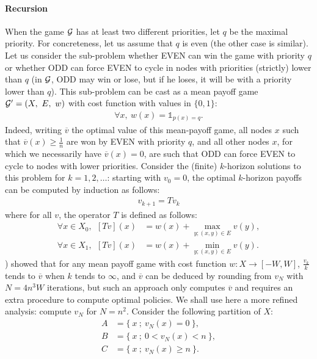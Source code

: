\documentclass{article}
\def\1{{\mathds 1}}
\def\G{{\cal G}}
\begin{document}
\paragraph{Recursion} When the game $\G$ has at least two different priorities, let $q$ be the maximal priority. For concreteness, let us assume that $q$ is even (the other case is similar).
Let us consider the sub-problem whether EVEN can win the game with priority $q$ or whether ODD can force EVEN to cycle in nodes with priorities (strictly) lower than $q$ (in $\G$, ODD may win or lose, but if he loses, it will be with a priority lower than $q$). This sub-problem can be cast as a mean payoff game $\G'=(X,~ E,~ w)$ with cost function with values in $\{0,1\}$:
\begin{align}
  \forall x,~ w(x) = \1_{p(x)=q}.
\end{align}
Indeed, writing $\overline v$ the optimal value of this mean-payoff game, all nodes $x$ such that $\overline v(x) \ge \frac{1}{n}$ are won by EVEN with priority $q$, and all other nodes $x$, for which we necessarily have $\overline v(x)=0$, are such that ODD can force EVEN to cycle to nodes with lower priorities.
Consider the (finite) $k$-horizon solutions to this problem for $k=1,2,\dots$: starting with $v_0=0$, the optimal $k$-horizon payoffs can be computed by induction as follows:
\begin{align}
  v_{k+1} = T v_k
\end{align}
where for all $v$, the operator $T$ is defined as follows:
\begin{align}
  \forall x \in X_0, ~~[T v](x) & = w(x) + \max_{y;(x,y)\in E} v(y), \\
  \forall x \in X_1, ~~[T v](x) & = w(x) + \min_{y;(x,y)\in E} v(y).
\end{align}
\citet{zwick96}) showed that for any mean payoff game with cost function $w:X \to [ -W, W]$, $\frac{v_k}{k}$ tends to $\overline v$ when $k$ tends to $\infty$, and $\overline v$ can be deduced by rounding from $v_N$ with $N=4n^3W$ iterations, but such an approach only computes $\overline v$ and requires an extra procedure to compute optimal policies. We shall use here a more refined analysis: compute $v_N$ for $N=n^2$. Consider the following partition of $X$:
\begin{align}
  A & = \{~ x ~;~ v_N(x)=0 ~\}, \\
  B &= \{~ x ~;~ 0 < v_N(x) < n ~\}, \\
  C &= \{~ x ~;~ v_N(x) \ge n ~\}.
\end{align}
\end{document}
